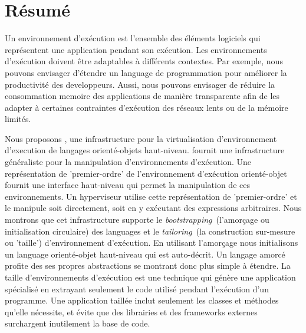 \documentclass[a4paper,11pt,twoside]{include/ThesisStyle}
\begin{document}





\appendix


%

\vspace*{-0.5in}
\section*{Résumé}
\footnotesize
Un environnement d'exécution est l'ensemble des éléments logiciels qui représentent une application pendant son exécution. Les environnements d'exécution doivent être adaptables à différents contextes. Par exemple, nous pouvons envisager d'étendre un language de programmation pour améliorer la productivité des developpeurs. Aussi, nous pouvons envisager de réduire la consommation memoire des applications de manière transparente afin de les adapter à certaines contraintes d'exécution \eg des réseaux lents ou de la mémoire limités.

Nous proposons \Vtt, une infrastructure pour la virtualisation d'environnement d'execution de langages orienté-objets haut-niveau. \Vtt fournit une infrastructure généraliste pour la manipulation d'environnements d'exécution. Une représentation de 'premier-ordre' de l'environnement d'exécution orienté-objet fournit une interface haut-niveau qui permet la manipulation de ces environnements. Un hyperviseur utilise cette représentation de 'premier-ordre' et le manipule soit directement, soit en y exécutant des expressions arbitraires.
Nous montrons que cet infrastructure supporte le \emph{bootstrapping}~(\ie l'amorçage ou initialisation circulaire) des languages et le \emph{tailoring}~(\ie la construction sur-mesure ou 'taille') d'environnement d'exécution. En utilisant l'amorçage nous initialisons un language orienté-objet haut-niveau qui est auto-décrit. Un langage amorcé profite des ses propres abstractions se montrant donc plus simple à étendre. La taille d'environnements d'exécution est une technique qui génère une application spécialisé en extrayant seulement le code utilisé pendant l'exécution d'un programme. Une application taillée inclut seulement les classes et méthodes qu'elle nécessite, et évite que des librairies et des frameworks externes surchargent inutilement la base de code.
\newline
\end{document}
